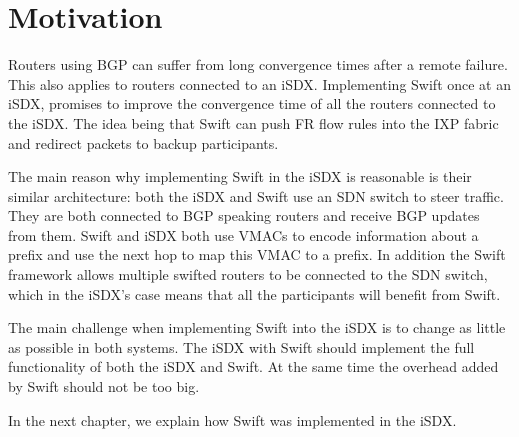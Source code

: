 
\chapter{\label{chapter3}Motivation}

Routers using BGP can suffer from long convergence times after a remote failure. This also applies to routers connected to an iSDX. Implementing Swift once at an iSDX, promises to improve the convergence time of all the routers connected to the iSDX. 
The idea being that Swift can push FR flow rules into the IXP fabric and redirect packets to backup participants.

The main reason why implementing Swift in the iSDX is reasonable is their similar architecture: both the iSDX and Swift use an SDN switch to steer traffic. They are both connected to BGP speaking routers and receive BGP updates from them. Swift and iSDX both use VMACs to encode information about a prefix and use the next hop to map this VMAC to a prefix. In addition the Swift framework allows multiple swifted routers to be connected to the SDN switch, which in the iSDX's case means that all the participants will benefit from Swift.

The main challenge when implementing Swift into the iSDX is to change as little as possible in both systems. The iSDX with Swift should implement the full functionality of both the iSDX and Swift. At the same time the overhead added by Swift should not be too big.

In the next chapter, we explain how Swift was implemented in the iSDX. 

